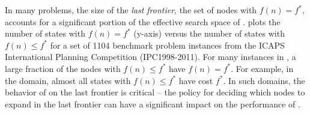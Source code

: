 In many problems, the size of the \emph{last frontier}, the set of nodes with $f(n)=f^*$, accounts for a significant portion of the effective search space of \astar.
 plots the number of states with $f(n) = f^*$ (y-axis)
versus the number of states with $f(n) \leq f^*$
for a set of 1104 benchmark problem instances from the ICAPS International Planning Competition (IPC1998-2011).
For many instances in ,  a large fraction of the nodes with $f(n) \leq f^*$ have $f(n)=f^*$.
For example, in the  domain, almost all states with $f(n) \leq f^*$ have cost $f^*$.
In such domains, the behavior of \astar on the last frontier is critical -- the policy for deciding which nodes to expand in the last frontier can have a significant impact on the performance of \astar.

